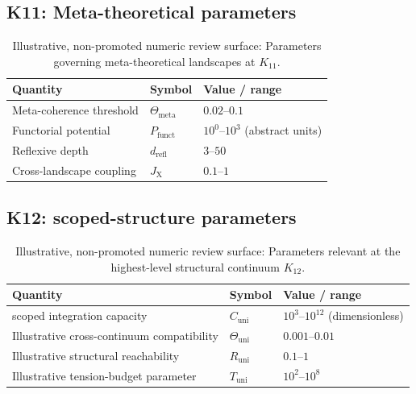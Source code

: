 
\subsection*{K11: Meta-theoretical parameters}

\begin{table}[h]
  \centering
  \caption{Illustrative, non-promoted numeric review surface: Parameters governing meta-theoretical landscapes at \(K_{11}\).}
  \label{tab:k11-meta-parameters}
  \begin{tabular}{lll}
    \hline
    Quantity & Symbol & Value / range \\
    \hline
    Meta-coherence threshold & \(\Theta_\mathrm{meta}\)
        & \(0.02\text{–}0.1\) \\
    Functorial potential & \(P_\mathrm{funct}\)
        & \(10^0\text{–}10^3\) (abstract units) \\
    Reflexive depth & \(d_\mathrm{refl}\)
        & \(3\text{–}50\) \\
    Cross-landscape coupling & \(J_\mathrm{X}\)
        & \(0.1\text{–}1\) \\
    \hline
  \end{tabular}
\end{table}


\subsection*{K12: scoped-structure parameters}

\begin{table}[h]
  \centering
  \caption{Illustrative, non-promoted numeric review surface: Parameters relevant at the highest-level structural continuum \(K_{12}\).}
  \label{tab:k12-scoped-parameters}
  \begin{tabular}{lll}
    \hline
    Quantity & Symbol & Value / range \\
    \hline
    scoped integration capacity & \(C_\mathrm{uni}\)
        & \(10^3\text{–}10^{12}\) (dimensionless) \\
    Illustrative cross-continuum compatibility & \(\Theta_\mathrm{uni}\)
        & \(0.001\text{–}0.01\) \\
    Illustrative structural reachability & \(R_\mathrm{uni}\)
        & \(0.1\text{–}1\) \\
    Illustrative tension-budget parameter & \(T_\mathrm{uni}\)
        & \(10^2\text{–}10^8\) \\
    \hline
  \end{tabular}
\end{table}
